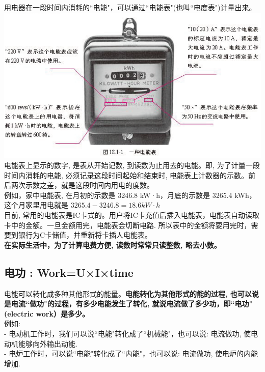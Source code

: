 \documentclass[UTF8]{ctexart}
\begin{document}
用电器在一段时间内消耗的``电能"，可以通过``电能表"(也叫``电度表")计量出来。\\

\includegraphics[width=1\textwidth]{img/0059.png} \\

电能表上显示的数字, 是表从开始记数, 到读数为止用去的电能。即, 为了计量一段时间内消耗的电能, 必须记录这段时间起始和结束时,  电能表上计数器的示数。前后两次示数之差，就是这段时间内用电的度数。 \\
例如，家中电能表, 在月初的示数是 3246.8 kW·h，月底的示数是 3265.4 kWh，这个月家里用电就是  $3265.4-3246.8= 18.6kW·h$ \\


目前, 常用的电能表是IC卡式的。用户将IC卡充值后插入电能表，电能表自动读取卡中的金额。一旦金额用完，电能表会切断电路. 所以表中的金额将要用完时，需要到银行为C卡储值，并重新将卡插人电能表。\\

\textbf{在实际生活中，为了计算电费方便, 读数时常常只读整数, 略去小数。}

\vspace{1em} 



\subsection{电功 : Work=U×I×time}

电能可以转化成多种其他形式的能量。\textbf{电能转化为其他形式的能的过程, 也可以说是电流``做功"的过程，有多少电能发生了转化, 就说电流做了多少功，即``电功"(electric work）是多少。}\\
例如: \\
- 电动机工作时，我们可以说``电能"转化成了``机械能"，也可以说: 电流做功, 使电动机能够向外输出动能. \\
- 电炉工作时，可以说``电能"转化成了``内能"，也可以说: 电流做功, 使电炉的内能增加. \\
\end{document}
